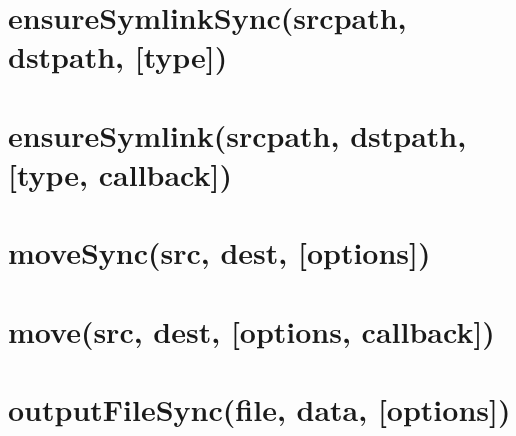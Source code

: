 \documentclass[twoside]{book}
\newcommand{\+}{\discretionary{\mbox{\scriptsize$\hookleftarrow$}}{}{}}
\begin{document}
\chapter{ensure\+Symlink\+Sync(srcpath, dstpath, \mbox{[}type\mbox{]})}
\label{md_dsmacc_vis_degree_node_modules_electron-packager_node_modules_fs-extra_docs_ensureSymlink-sync}

\chapter{ensure\+Symlink(srcpath, dstpath, \mbox{[}type, callback\mbox{]})}
\label{md_dsmacc_vis_degree_node_modules_electron-packager_node_modules_fs-extra_docs_ensureSymlink}

\chapter{move\+Sync(src, dest, \mbox{[}options\mbox{]})}
\label{md_dsmacc_vis_degree_node_modules_electron-packager_node_modules_fs-extra_docs_move-sync}

\chapter{move(src, dest, \mbox{[}options, callback\mbox{]})}
\label{md_dsmacc_vis_degree_node_modules_electron-packager_node_modules_fs-extra_docs_move}

\chapter{output\+File\+Sync(file, data, \mbox{[}options\mbox{]})}
\label{md_dsmacc_vis_degree_node_modules_electron-packager_node_modules_fs-extra_docs_outputFile-sync}

\end{document}
